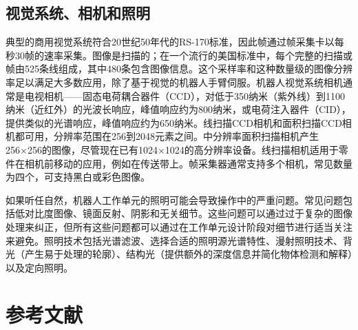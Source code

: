 \documentclass[UTF8,a4paper]{ctexart}
\begin{document}
\subsection{视觉系统、相机和照明}

典型的商用视觉系统符合20世纪50年代的RS-170标准，因此帧通过帧采集卡以每秒30帧的速率采集。图像是扫描的；在一个流行的美国标准中，每个完整的扫描或帧由525条线组成，其中480条包含图像信息。这个采样率和这种数量级的图像分辨率足以满足大多数应用，除了基于视觉的机器人手臂伺服。机器人视觉系统相机通常是电视相机——固态电荷耦合器件（CCD），对低于350纳米（紫外线）到1100纳米（近红外）的光波长响应，峰值响应约为800纳米，或电荷注入器件（CID），提供类似的光谱响应，峰值响应约为650纳米。线扫描CCD相机和面积扫描CCD相机都可用，分辨率范围在256到2048元素之间。中分辨率面积扫描相机产生256×256的图像，尽管现在已有1024×1024的高分辨率设备。线扫描相机适用于零件在相机前移动的应用，例如在传送带上。帧采集器通常支持多个相机，常见数量为四个，可支持黑白或彩色图像。

如果听任自然，机器人工作单元的照明可能会导致操作中的严重问题。常见问题包括低对比度图像、镜面反射、阴影和无关细节。这些问题可以通过过于复杂的图像处理来纠正，但所有这些问题都可以通过在工作单元设计阶段对细节进行适当关注来避免。照明技术包括光谱滤波、选择合适的照明源光谱特性、漫射照明技术、背光（产生易于处理的轮廓）、结构光（提供额外的深度信息并简化物体检测和解释）以及定向照明。

\section*{参考文献}
\end{document}
